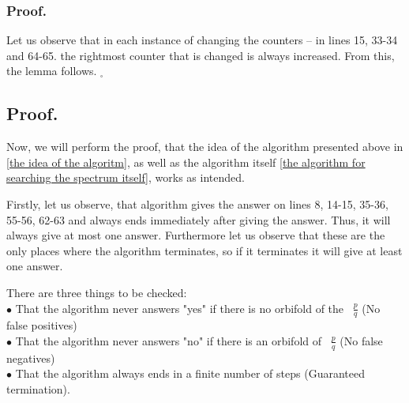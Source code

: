 \subsubsection{Proof.}
Let us observe that in each instance of changing the counters -- in lines 15, 33-34 and 64-65. 
the rightmost counter that is changed is always increased. From this, the lemma follows. 
$_\square$
\subsection{Proof.}\label{proof of the correctness of the algorithm}
Now, we will perform the proof, that the idea of the algorithm presented above in 
\ref{the idea of the algoritm}, as 
well as the algorithm itself \ref{the algorithm for searching the spectrum itself}, 
works as intended.

Firstly, let us observe, that algorithm gives the answer on lines 8, 14-15, 35-36, 55-56, 
62-63 and 
always ends immediately after giving the answer. Thus, it will always give at most one answer.
Furthermore let us observe that these are the only places where the algorithm terminates, 
so if it terminates it will give at least one answer.
 
There are three things to be checked: \\
$\bullet$ That the algorithm never answers "yes" if there is no orbifold of the \Eoc\ 
$\frac{p}{q}$ (No false positives)\\
$\bullet$ That the algorithm never answers "no" if there is an orbifold of \Eoc\ 
$\frac{p}{q}$ (No false negatives)\\ 
$\bullet$ That the algorithm always ends in a finite number of steps (Guaranteed termination). 








